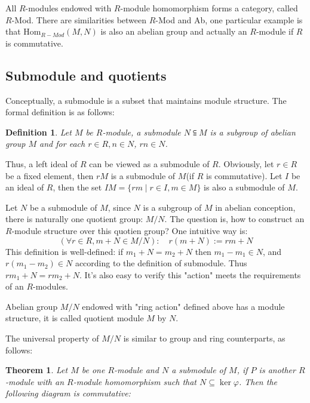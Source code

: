 \documentclass[a4paper, pdf, 11.5pt]{article}
\newtheorem{definition}{Definition}
\newtheorem{theorem}{Theorem}
\begin{document}
All $R$-modules endowed with $R$-module homomorphism forms a category, called $R$-\mbox{Mod}. There are similarities
between $R$-\mbox{Mod} and \mbox{Ab}, one particular example is that $\mbox{Hom}_{R-Mod}(M, N)$ is also an abelian group
and actually an $R$-module if $R$ is commutative.

\subsection{Submodule and quotients}
Conceptually, a submodule is a subset that maintains module structure. The formal definition is as follows:
\begin{definition}
  Let $M$ be $R$-module, a submodule $N\subseteqq M$ is a subgroup of abelian group $M$ and for each $r\in R, n\in N$, 
  $rn\in N$.
\end{definition}
Thus, a left ideal of $R$ can be viewed as a submodule of $R$. Obviously, let $r\in R$ be a fixed element, then $rM$ is a 
submodule of $M$(if $R$ is commutative). Let $I$ be an ideal of $R$, then the set $IM=\{rm\mid r\in I,m\in M\}$ is also a 
submodule of $M$.

Let $N$ be a submodule of $M$, since $N$ is a subgroup of $M$ in abelian conception, there is naturally one 
quotient group: $M/N$. The question is, how to construct an $R$-module structure over this quotien group? One intuitive 
way is:
$$
(\forall r\in R, m+N\in M/N):\quad r(m+N):= rm+N
$$
This definition is well-defined: if $m_1+N=m_2+N$ then $m_1-m_1\in N$, and $r(m_1-m_2)\in N$
according to the definition of submodule. Thus $rm_1+N=rm_2+N$. It's also easy to verify this 
"action" meets the requirements of an $R$-modules. 

Abelian group $M/N$ endowed with "ring action" defined above has a module structure, it is called 
quotient module $M$ by $N$.

The universal property of $M/N$ is similar to group and ring counterparts, as follows:
\begin{theorem}
  Let $M$ be one $R$-module and $N$ a submodule of $M$, if $P$ is another $R$-module with an $R$-module homomorphism 
  such that $N\subseteq\ker \varphi$. Then the following diagram is commutative:
\end{theorem}
\end{document}
